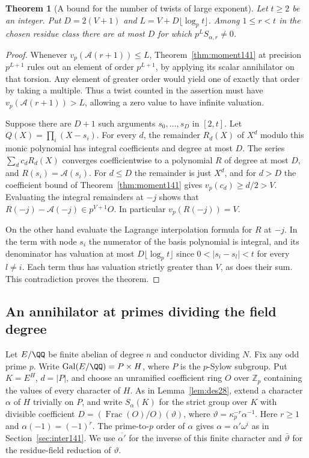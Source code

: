\documentclass[a4paper,11pt]{article}
\newtheorem{theorem}[proposition]{Theorem}
\theoremstyle{definition}
\theoremstyle{remark}
\newcommand{\ZZ}{\mathbb Z}\newcommand{\ord}{\operatorname{ord}}
\numberwithin{equation}{section}
\begin{document}
\begin{theorem}[A bound for the number of twists of large exponent]
\label{thm:inter141}
Let \(t\ge2\) be an integer. Put \(D=2(V+1)\) and
\(L=V+D\lfloor\log_p t\rfloor\). Among \(1\le r<t\) in the
chosen residue class there are at most \(D\) for which
\(p^L S_{\alpha,r}\ne0\).
\end{theorem}
\begin{proof}
Whenever \(v_p(\mathcal A(r+1))\le L\), Theorem~\ref{thm:moment141}
at precision \(p^{L+1}\) rules out an element of order
\(p^{L+1}\), by applying its scalar annihilator on that torsion.
Any element of greater order would yield one of exactly that
order by taking a multiple. Thus a twist counted in the
assertion must have \(v_p(\mathcal A(r+1))>L\), allowing a zero
value to have infinite valuation.

Suppose there are \(D+1\) such arguments \(s_0,\ldots,s_D\)
in \([2,t]\). Let \(Q(X)=\prod_i(X-s_i)\). For every \(d\),
the remainder \(R_d(X)\) of \(X^d\) modulo this monic polynomial
has integral coefficients and degree at most \(D\).
The series \(\sum_d c_dR_d(X)\) converges coefficientwise to
a polynomial \(R\) of degree at most \(D\), and
\(R(s_i)=\mathcal A(s_i)\). For \(d\le D\) the remainder is
just \(X^d\), and for \(d>D\) the coefficient bound of
Theorem~\ref{thm:moment141} gives \(v_p(c_d)\ge d/2>V\).
Evaluating the integral remainders at \(-j\) shows that
\(R(-j)-\mathcal A(-j)\in p^{V+1}O\). In particular
\(v_p(R(-j))=V\).

On the other hand evaluate the Lagrange interpolation formula
for \(R\) at \(-j\). In the term with node \(s_i\) the numerator
of the basis polynomial is integral, and its denominator has
valuation at most \(D\lfloor\log_p t\rfloor\) since
\(0<|s_i-s_l|<t\) for every \(l\ne i\).
Each term thus has valuation strictly greater than \(V\),
as does their sum. This contradiction proves the theorem.
\end{proof}

\subsection{An annihilator at primes dividing the field degree}\label{nav:III-21}
\label{sec:family143}

Let \(E/\QQ\) be finite abelian of degree \(n\) and conductor
dividing \(N\). Fix any odd prime \(p\). Write
\(\operatorname{Gal}(E/\QQ)=P\times H\), where \(P\) is
the \(p\)-Sylow subgroup. Put \(K=E^H\), \(d=|P|\), and
choose an unramified coefficient ring \(O\) over \(\ZZ_p\)
containing the values of every character of \(H\). As in
Lemma~\ref{lem:des28}, extend a character \(\alpha\) of \(H\)
trivially on \(P\), and write \(S_\alpha(K)\) for the strict
group over \(K\) with divisible coefficient
\(D=(\operatorname{Frac}(O)/O)(\vartheta)\), where
\(\vartheta=\kappa_p^{-r}\alpha^{-1}\). Here \(r\ge1\) and
\(\alpha(-1)=(-1)^r\). The prime-to-\(p\) order of \(\alpha\)
gives \(\alpha=\alpha'\omega^i\) as in Section~\ref{sec:inter141}.
We use \(\overline{\alpha'}\) for the inverse of this finite
character and \(\bar\vartheta\) for the residue-field reduction
of \(\vartheta\).
\end{document}
